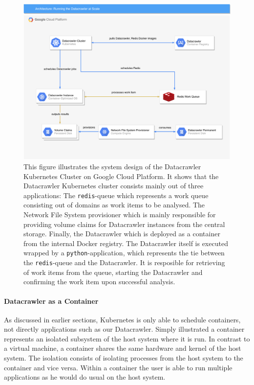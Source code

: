 \begin{figure}
	\centering
	\includegraphics[scale=0.5]{resources/datacrawler_k8s_architecture}
	\caption[System Design of "Running the Datacrawler at Scale"]{This figure illustrates the system design of the Datacrawler Kubernetes Cluster on Google Cloud Platform. It shows that the Datacrawler Kubernetes cluster consists mainly out of three applications: The \texttt{redis}-queue which represents a work queue consisting out of domains as work items to be analysed. The Network File System provisioner which is mainly responsible for providing volume claims for Datacrawler instances from the central storage. Finally, the Datacrawler which is deployed as a container from the internal Docker registry. The Datacrawler itself is executed wrapped by a \texttt{python}-application, which represents the tie between the \texttt{redis}-queue and the Datacrawler. It is resposible for retrieving of work items from the queue, starting the Datacrawler and confirming the work item upon successful analysis.}
	\label{datacrawler_k8s_architecture}
\end{figure}
\paragraph*{Datacrawler as a Container}
\label{datacrawler_container}

As discussed in earlier sections, Kubernetes is only able to schedule containers, not directly applications such as our Datacrawler. Simply illustrated a container represents an isolated subsystem of the host system where it is run. In contrast to a virtual machine, a container shares the same hardware and kernel of the host system. The isolation consists of isolating processes from the host system to the container and vice versa. Within a container the user is able to run multiple applications as he would do usual on the host system. 


